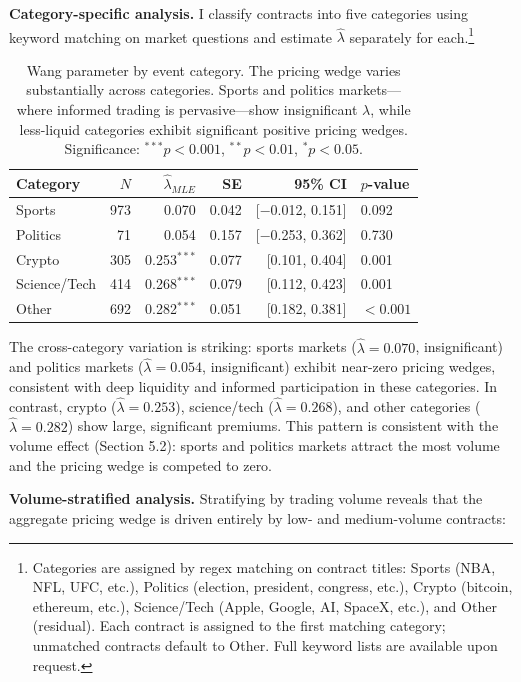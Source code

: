 \documentclass[12pt,a4paper]{article}
\begin{document}
\textbf{Category-specific analysis.} I classify contracts into five
categories using keyword matching on market questions and estimate
\(\hat{\lambda}\) separately for
each.\footnote{Categories are assigned by regex matching on contract titles: Sports (NBA, NFL, UFC, etc.), Politics (election, president, congress, etc.), Crypto (bitcoin, ethereum, etc.), Science/Tech (Apple, Google, AI, SpaceX, etc.), and Other (residual). Each contract is assigned to the first matching category; unmatched contracts default to Other. Full keyword lists are available upon request.}

\begin{table}[H]
\centering
\small
\caption{Wang parameter by event category. The pricing wedge varies substantially across categories. Sports and politics markets---where informed trading is pervasive---show insignificant $\lambda$, while less-liquid categories exhibit significant positive pricing wedges. Significance: $^{***}p<0.001$, $^{**}p<0.01$, $^{*}p<0.05$.}
\begin{tabular}{lrrrrl}
\toprule
Category & $N$ & $\hat{\lambda}_{MLE}$ & SE & 95\% CI & $p$-value \\
\midrule
Sports & 973 & 0.070 & 0.042 & [$-$0.012, 0.151] & 0.092 \\
Politics & 71 & 0.054 & 0.157 & [$-$0.253, 0.362] & 0.730 \\
Crypto & 305 & 0.253$^{***}$ & 0.077 & [0.101, 0.404] & 0.001 \\
Science/Tech & 414 & 0.268$^{***}$ & 0.079 & [0.112, 0.423] & 0.001 \\
Other & 692 & 0.282$^{***}$ & 0.051 & [0.182, 0.381] & $<0.001$ \\
\bottomrule
\end{tabular}
\end{table}

The cross-category variation is striking: sports markets
(\(\hat{\lambda} = 0.070\), insignificant) and politics markets
(\(\hat{\lambda} = 0.054\), insignificant) exhibit near-zero pricing
wedges, consistent with deep liquidity and informed participation in
these categories. In contrast, crypto (\(\hat{\lambda} = 0.253\)),
science/tech (\(\hat{\lambda} = 0.268\)), and other categories
(\(\hat{\lambda} = 0.282\)) show large, significant premiums. This
pattern is consistent with the volume effect (Section 5.2): sports and
politics markets attract the most volume and the pricing wedge is
competed to zero.

\textbf{Volume-stratified analysis.} Stratifying by trading volume
reveals that the aggregate pricing wedge is driven entirely by low- and
medium-volume contracts:
\end{document}
